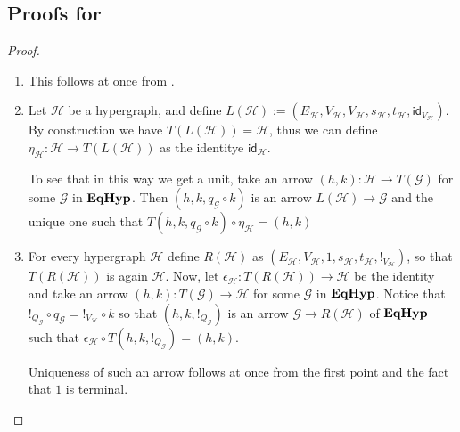 \documentclass[a4paper,UKenglish,cleveref,pdftex,thm-restate,numberwithinsect]{lipics-v2021}
\newcommand{\catname}[1]{\textbf{\textup{#1}}}
\newcommand{\EqHyp}{\catname{EqHyp}} %
\newcommand{\id}[1]{\mathsf{id}_{#1}}
\begin{document}
\subsection{Proofs for }\label{app:due}
\fhyp*

\begin{proof}\label{proof:forghyp}
	\begin{enumerate}
		\item  This follows at once from .
		\item  	Let $\mathcal{H}$ be a hypergraph, and define $L(\mathcal{H}) := (E_\mathcal{H}, V_{\mathcal{H}}, V_{\mathcal{H}}, s_\mathcal{H}, t_\mathcal{H}, \id{V_\mathcal{H}})$.  By construction we have $T(L(\mathcal{H}))=\mathcal{H}$, thus we can define
		$\eta_\mathcal{H}\colon \mathcal{H}\to T(L(\mathcal{H}))$ as the identitye $\id{\mathcal{H}}$. 
		
		To see that in this way we get a unit,  take an arrow $(h, k)\colon \mathcal{H}\to T(\mathcal{G})$ for some $\mathcal{G}$ in $\EqHyp$. Then $(h,k, q_{\mathcal{G}}\circ k)$ is an arrow $L(\mathcal{H})\to \mathcal{G}$ and the unique one such that $T(h,k, q_{\mathcal{G}}\circ k)\circ \eta_{\mathcal{H}}=(h,k)$
		
		\item For every hypergraph $\mathcal{H}$ define $R(\mathcal{H})$ as $(E_\mathcal{H}, V_{\mathcal{H}}, 1, s_\mathcal{H}, t_\mathcal{H}, !_{V_\mathcal{H}})$, so that $T(R(\mathcal{H}))$ is again $\mathcal{H}$.  Now, let $\epsilon_{\mathcal{H}}\colon T(R(\mathcal{H}))\to \mathcal{H}$ be the identity and take an arrow $(h,k)\colon T(\mathcal{G})\to \mathcal{H}$ for some $\mathcal{G}$ in $\EqHyp$.  Notice that $!_{Q_\mathcal{G}}\circ q_{\mathcal{G}}=!_{V_{\mathcal{H}}}\circ k$
		so that $(h,k, !_{Q_\mathcal{G}})$ is an arrow $\mathcal{G}\to R(\mathcal{H})$ of $\EqHyp$ such that $\epsilon_{\mathcal{H}}\circ T(h,k, !_{Q_\mathcal{G}})=(h,k)$.
		
		Uniqueness of such an arrow follows at once from the first point and the fact that $1$ is terminal. \qedhere 
	\end{enumerate}
\end{proof}
\end{document}
